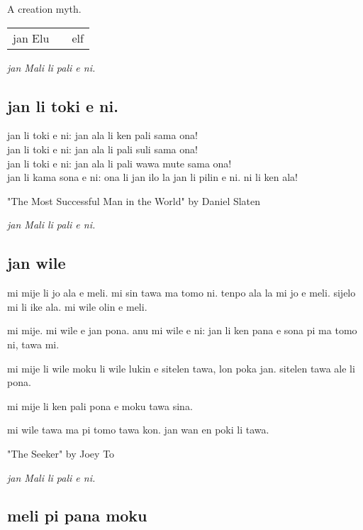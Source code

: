 A creation myth.

\begin{supertabular}{p{5,5cm}|ll}
    jan Elu &  & elf \\
\end{supertabular}

\textit{jan Mali li pali e ni. \cite{www:astrodonunt:01}}

\subsection{jan li toki e ni.}

jan li toki e ni: jan ala li ken pali sama ona! \\
jan li toki e ni: jan ala li pali suli sama ona! \\
jan li toki e ni: jan ala li pali wawa mute sama ona! \\
jan li kama sona e ni: ona li jan ilo la jan li pilin e ni. ni li ken ala!

"The Most Successful Man in the World" by Daniel Slaten

\textit{jan Mali li pali e ni. \cite{www:astrodonunt:01}}

\newpage
\subsection{jan wile}

mi mije li jo ala e meli.
mi sin tawa ma tomo ni.
tenpo ala la mi jo e meli.
sijelo mi li ike ala.
mi wile olin e meli.

mi mije.
mi wile e jan pona.
anu mi wile e ni: jan li ken pana e sona pi ma tomo ni, tawa mi.

mi mije li wile moku li wile lukin e sitelen tawa, lon poka jan.
sitelen tawa ale li pona.

mi mije li ken pali pona e moku tawa sina.

mi wile tawa ma pi tomo tawa kon.
jan wan en poki li tawa.

"The Seeker" by Joey To

\textit{jan Mali li pali e ni. \cite{www:astrodonunt:01}}

\subsection{meli pi pana moku}

